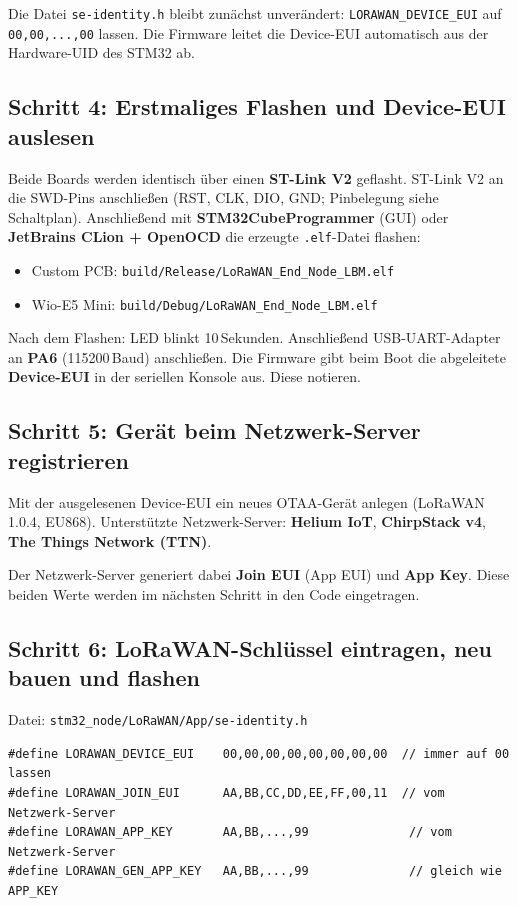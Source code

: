 \documentclass[11pt,a4paper]{scrartcl}
\begin{document}
Die Datei \texttt{se-identity.h} bleibt zunächst unverändert: \texttt{LORAWAN\_DEVICE\_EUI} auf \texttt{00,00,...,00} lassen. Die Firmware leitet die Device-EUI automatisch aus der Hardware-UID des STM32 ab.

\subsection*{Schritt 4: Erstmaliges Flashen und Device-EUI auslesen}

Beide Boards werden identisch über einen \textbf{ST-Link V2} geflasht. ST-Link V2 an die SWD-Pins anschließen (RST, CLK, DIO, GND; Pinbelegung siehe Schaltplan). Anschließend mit \textbf{STM32CubeProgrammer} (GUI) oder \textbf{JetBrains CLion + OpenOCD} die erzeugte \texttt{.elf}-Datei flashen:
\begin{itemize}
  \item Custom PCB: \texttt{build/Release/LoRaWAN\_End\_Node\_LBM.elf}
  \item Wio-E5 Mini: \texttt{build/Debug/LoRaWAN\_End\_Node\_LBM.elf}
\end{itemize}

Nach dem Flashen: LED blinkt 10\,Sekunden. Anschließend USB-UART-Adapter an \textbf{PA6} (115200\,Baud) anschließen. Die Firmware gibt beim Boot die abgeleitete \textbf{Device-EUI} in der seriellen Konsole aus. Diese notieren.

\subsection*{Schritt 5: Gerät beim Netzwerk-Server registrieren}

Mit der ausgelesenen Device-EUI ein neues OTAA-Gerät anlegen (LoRaWAN 1.0.4, EU868). Unterstützte Netzwerk-Server: \textbf{Helium IoT}, \textbf{ChirpStack v4}, \textbf{The Things Network (TTN)}.

Der Netzwerk-Server generiert dabei \textbf{Join EUI} (App EUI) und \textbf{App Key}. Diese beiden Werte werden im nächsten Schritt in den Code eingetragen.

\subsection*{Schritt 6: LoRaWAN-Schlüssel eintragen, neu bauen und flashen}

Datei: \texttt{stm32\_node/LoRaWAN/App/se-identity.h}

\begin{verbatim}
#define LORAWAN_DEVICE_EUI    00,00,00,00,00,00,00,00  // immer auf 00 lassen
#define LORAWAN_JOIN_EUI      AA,BB,CC,DD,EE,FF,00,11  // vom Netzwerk-Server
#define LORAWAN_APP_KEY       AA,BB,...,99              // vom Netzwerk-Server
#define LORAWAN_GEN_APP_KEY   AA,BB,...,99              // gleich wie APP_KEY
\end{verbatim}
\end{document}
